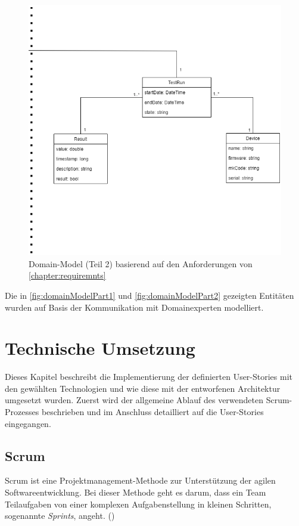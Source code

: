 \documentclass[a4paper, fontsize=11pt, parskip=half, twoside, headings=openright]{scrreprt}
\begin{document}
	\begin{figure}[ht]
		\centering
		\includegraphics[scale=0.55]{assets/TCMS_DomainModel_part2.png}
		\caption{Domain-Model (Teil 2) basierend auf den Anforderungen von \autoref{chapter:requiremnts}}
		\label{fig:domainModelPart2}
	\end{figure}
	
	Die in \autoref{fig:domainModelPart1} und \autoref{fig:domainModelPart2} gezeigten Entitäten wurden auf Basis der Kommunikation mit Domainexperten modelliert.
	
	
	
	\chapter{Technische Umsetzung}
	Dieses Kapitel beschreibt die Implementierung der definierten User-Stories mit den gewählten Technologien und wie diese mit der entworfenen Architektur umgesetzt wurden. 
	Zuerst wird der allgemeine Ablauf des verwendeten Scrum-Prozesses beschrieben und im Anschluss detailliert auf die User-Stories eingegangen. 

	\section{Scrum}
	Scrum ist eine Projektmanagement-Methode zur Unterstützung der agilen Softwareentwicklung.
	Bei dieser Methode geht es darum, dass ein Team Teilaufgaben von einer komplexen Aufgabenstellung in kleinen Schritten, sogenannte \emph{Sprints}, angeht. (\textcite{rubin_essential_2012})
	
\end{document}
